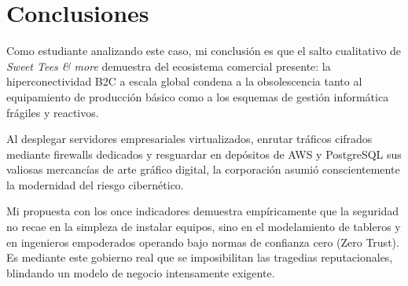 \documentclass[11pt,a4paper]{article}
\begin{document}
\section{Conclusiones}

Como estudiante analizando este caso, mi conclusión es que el salto cualitativo de \textit{Sweet Tees \& more} demuestra del ecosistema comercial presente: la hiperconectividad B2C a escala global condena a la obsolescencia tanto al equipamiento de producción básico como a los esquemas de gestión informática frágiles y reactivos.

Al desplegar servidores empresariales virtualizados, enrutar tráficos cifrados mediante firewalls dedicados y resguardar en depósitos de AWS y PostgreSQL sus valiosas mercancías de arte gráfico digital, la corporación asumió conscientemente la modernidad del riesgo cibernético. 

Mi propuesta con los once indicadores demuestra empíricamente que la seguridad no recae en la simpleza de instalar equipos, sino en el modelamiento de tableros y en ingenieros empoderados operando bajo normas de confianza cero (Zero Trust). Es mediante este gobierno real que se imposibilitan las tragedias reputacionales, blindando un modelo de negocio intensamente exigente.
\end{document}
